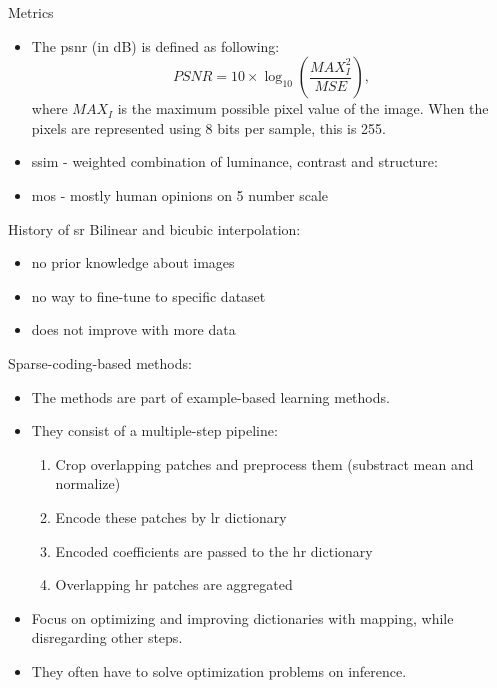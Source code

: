 \documentclass[hyperref={unicode}, xcolor=dvipsnames, t]{beamer}
\begin{document}
\begin{frame}{Metrics}
    \begin{itemize}
        \item<1-3> The \gls{psnr} (in dB) is defined as following:
        $$ PSNR =  10\times\log_{10} \left(\frac{MAX^2_I}{MSE}\right), $$
        where $MAX_I$ is the maximum possible pixel value of the image. When the pixels are represented using 8 bits per sample, this is 255. 
        \item<2-3> \gls{ssim} - weighted combination of luminance, contrast and structure:
        
        \item<3> \gls{mos} - mostly human opinions on 5 number scale
    \end{itemize}
\end{frame}

\begin{frame}{History of \gls{sr}}
Bilinear and \alert{bicubic} interpolation:
\begin{itemize}
    \item no \alert{prior knowledge} about images
    \item no way to \alert{fine-tune to specific dataset}
    \item does not improve with \alert{more data}
\end{itemize}

Sparse-coding-based methods:
\begin{itemize}
    \item The methods are part of example-based learning methods.
    \item They consist of a \alert{multiple-step pipeline}:
    \begin{enumerate}
        \item Crop overlapping patches and preprocess them (substract mean and normalize)
        \item Encode these patches by \gls{lr} dictionary
        \item Encoded coefficients are passed to the \gls{hr} dictionary
        \item Overlapping \gls{hr} patches are aggregated
    \end{enumerate}
    \item Focus on optimizing and improving dictionaries with mapping, while \alert{disregarding other steps}.
    \item They often have to solve \alert{optimization problems on inference}.
\end{itemize}
\end{frame}
\end{document}
